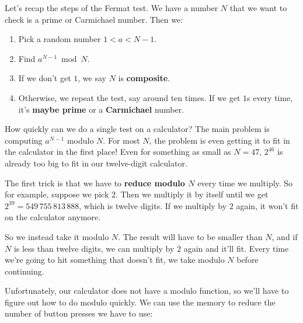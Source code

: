 \documentclass[11pt,paper=letter]{scrartcl}
\begin{document}
Let's recap the steps of the Fermat test. We have a number $N$ that we want to check is a prime or Carmichael number. Then we:
\begin{enumerate}
  \item Pick a random number $1 < a < N - 1$.
  \item Find $a^{N-1} \bmod N$.
  \item If we don't get $1$, we say $N$ is \textbf{composite}.
  \item Otherwise, we repeat the test, say around ten times. If we get $1$s every time, it's \textbf{maybe prime} or a \textbf{Carmichael} number.
\end{enumerate}
How quickly can we do a single test on a calculator? The main problem is computing $a^{N-1}$ modulo $N$. For most $N$, the problem is even getting it to fit in the calculator in the first place! Even for something as small as $N = 47$, $2^{46}$ is already too big to fit in our twelve-digit calculator.

The first trick is that we have to \textbf{reduce modulo $N$} every time we multiply. So for example, suppose we pick $2$. Then we multiply it by itself until we get $2^{39} = 549\,755\,813\,888$, which is twelve digits. If we multiply by $2$ again, it won't fit on the calculator anymore.

So we instead take it modulo $N$. The result will have to be smaller than $N$, and if $N$ is less than twelve digits, we can multiply by $2$ again and it'll fit. Every time we're going to hit something that doesn't fit, we take modulo $N$ before continuing.

Unfortunately, our calculator does not have a modulo function, so we'll have to figure out how to do modulo quickly. We can use the memory to reduce the number of button presses we have to use:

\end{document}
